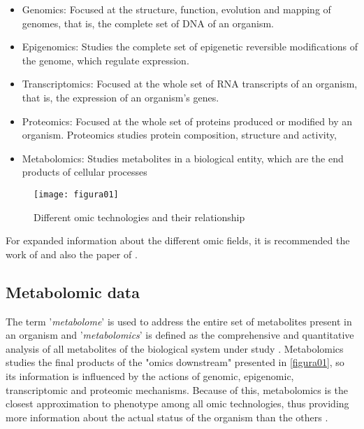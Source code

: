 \begin{itemize}
    \item Genomics: Focused at the structure, function, evolution and mapping of genomes, that is, the complete set of DNA of an organism.
    \item Epigenomics: Studies the complete set of epigenetic reversible modifications of the genome, which regulate expression.
    \item Transcriptomics: Focused at the whole set of RNA transcripts of an organism, that is, the expression of an organism's genes.
    \item Proteomics: Focused at the whole set of proteins produced or modified by an organism. Proteomics studies protein composition, structure and activity,
    \item Metabolomics: Studies metabolites in a biological entity, which are the end products of cellular processes
\end{itemize}

\begin{figure}[htbp]\centering
		\texttt{[image: figura01]}
		\caption{Different omic technologies and their relationship}
		\label{figura01}
	\end{figure}

For expanded information about the different omic fields, it is recommended the work of \cite{2018iv} and also the paper of \cite{horgan2011omic}.

\subsection{Metabolomic data}
The term '\textit{metabolome}' is used to address the entire set of metabolites present in an organism and '\textit{metabolomics}' is defined as the comprehensive and quantitative analysis of all metabolites of the biological system under study \parencite{fiehn2001combining}. Metabolomics studies the final products of the "omics downstream" presented in \autoref{figura01}, so its information is influenced by the actions of genomic, epigenomic, transcriptomic and proteomic mechanisms. Because of this, metabolomics is the closest approximation to phenotype among all omic technologies, thus providing  more information about the actual status of the organism than the others \parencite{beger2016metabolomics}. 

